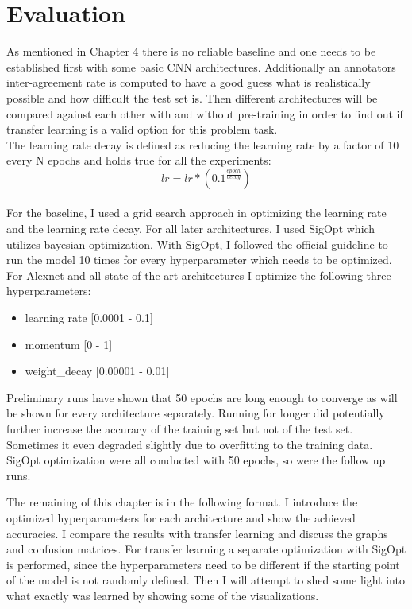 \chapter{Evaluation}

As mentioned in Chapter 4 there is no reliable baseline and one needs to be established first with some basic CNN architectures. Additionally an annotators inter-agreement rate is computed to have a good guess what is realistically possible and how difficult the test set is. Then different architectures will be compared against each other with and without pre-training in order to find out if transfer learning is a valid option for this problem task. \\

The learning rate decay is defined as reducing the learning rate by a factor of 10 every N epochs and holds true for all the experiments: \\

\[ lr = lr * (0.1^{\frac{epoch}{decay}}) \] \\

For the baseline, I used a grid search approach in optimizing the learning rate and the learning rate decay. For all later architectures, I used SigOpt which utilizes bayesian optimization. With SigOpt, I followed the official guideline to run the model 10 times for every hyperparameter which needs to be optimized. For Alexnet and all state-of-the-art architectures I optimize the following three hyperparameters: \\

\begin{itemize}
  \item learning rate [0.0001 - 0.1]
  \item momentum [0 - 1]
  \item weight\_decay [0.00001 - 0.01]
\end{itemize} 

\quad

Preliminary runs have shown that 50 epochs are long enough to converge as will be shown for every architecture separately. Running for longer did potentially further increase the accuracy of the training set but not of the test set. Sometimes it even degraded slightly due to overfitting to the training data. SigOpt optimization were all conducted with 50 epochs, so were the follow up runs.

The remaining of this chapter is in the following format. I introduce the optimized hyperparameters for each architecture and show the achieved accuracies. I compare the results with transfer learning and discuss the graphs and confusion matrices. For transfer learning a separate optimization with SigOpt is performed, since the hyperparameters need to be different if the starting point of the model is not randomly defined. Then I will attempt to shed some light into what exactly was learned by showing some of the visualizations.








